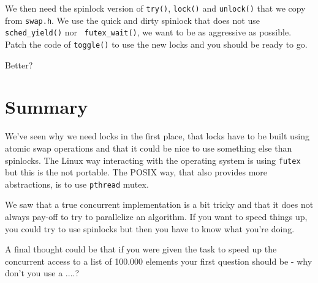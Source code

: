\documentclass[a4paper,11pt]{article}
\begin{document}
We then need the spinlock version of {\tt try()}, {\tt lock()} and
{\tt unlock()} that we copy from {\tt swap.h}. We use the quick and
dirty spinlock that does not use {\tt sched\_yield()} nor {\tt
  futex\_wait()}, we want to be as aggressive as possible. Patch the
code of {\tt toggle()} to use the new locks and you should be ready
to go.

Better?

\section{Summary}

We've seen why we need locks in the first place, that locks have to be
built using atomic swap operations and that it could be nice to use
something else than spinlocks. The Linux way interacting with the
operating system is using {\tt futex} but this is the not
portable. The POSIX way, that also provides more abstractions, is to
use {\tt pthread} mutex. 

We saw that a true concurrent implementation is a bit tricky and that
it does not always pay-off to try to parallelize an algorithm. If you
want to speed things up, you could try to use spinlocks but then you
have to know what you're doing.

A final thought could be that if you were given the task to speed up
the concurrent access to a list of 100.000 elements your first question
should be - why don't you use a ....?
\end{document}
